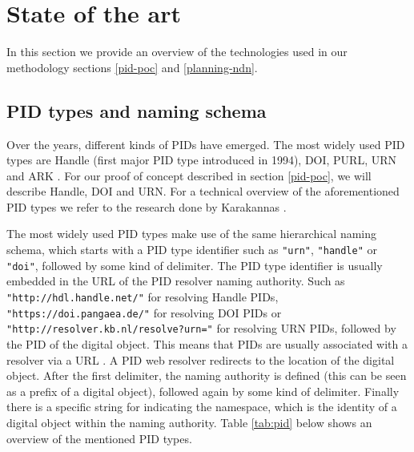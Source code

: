 \section{State of the art}
\label{tech-oview}

In this section we provide an overview of the technologies used in our methodology sections \ref{pid-poc} and \ref{planning-ndn}.

\subsection{PID types and naming schema}\label{pid-types}
Over the years, different kinds of PIDs have emerged. The most widely used PID types are Handle (first major PID type introduced in 1994), DOI, PURL, URN and ARK \cite{pid-oview, odin, hdl}. For our proof of concept described in section \ref{pid-poc}, we will describe Handle, DOI and URN. For a technical overview of the aforementioned PID types we refer to the research done by Karakannas \cite{icn-bd}. 

The most widely used PID types make use of the same hierarchical naming schema, which starts with a PID type identifier such as \texttt{"urn"}, \texttt{"handle"} or \texttt{"doi"}, followed by some kind of delimiter. The PID type identifier is usually embedded in the URL of the PID resolver naming authority. Such as \texttt{"http://hdl.handle.net/"} for resolving Handle PIDs, \texttt{"https://doi.pangaea.de/"} for resolving DOI PIDs or \texttt{"http://resolver.kb.nl/resolve?urn="} for resolving URN PIDs, followed by the PID of the digital object. This means that PIDs are usually associated with a resolver via a URL \cite{ids, icn-bd}. A PID web resolver redirects to the location of the digital object. After the first delimiter, the naming authority is defined (this can be seen as a prefix of a digital object), followed again by some kind of delimiter. Finally there is a specific string for indicating the namespace, which is the identity of a digital object within the naming authority. Table \ref{tab:pid} below shows an overview of the mentioned PID types. 

